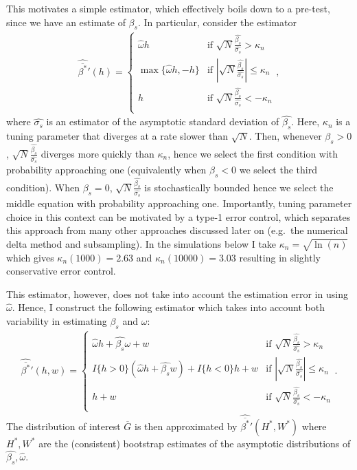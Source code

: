 \documentclass[12pt,a4paper,english]{article} %
\numberwithin{equation}{section}
\theoremstyle{definition}
\theoremstyle{remark}
\theoremstyle{plain}
\begin{document}
This motivates a simple estimator, which effectively boils down to a pre-test, since we have an estimate of $\beta_s$.
In particular, consider the estimator
\begin{align*}
  \hat{\overline{\beta^*}}'(h) =
  \begin{cases}
    \hat{\omega} h  &\text{if } \sqrt{N}\frac{\hat{\beta_s}}{\hat{\sigma_s}} > \kappa_n \\
    \max\{\hat{\omega} h, -h\} & \text{if } |\sqrt{N}\frac{\hat{\beta_s}}{\hat{\sigma_s}}| \leq \kappa_n \\
    h         & \text{if } \sqrt{N}\frac{\hat{\beta_s}}{\hat{\sigma_s}} < -\kappa_n\\
  \end{cases},
\end{align*}
where $\hat{\sigma_s}$ is an estimator of the asymptotic standard deviation of $\hat{\beta_s}$.
Here, $\kappa_n$ is a tuning parameter that diverges at a rate slower than $\sqrt{N}$.
Then, whenever $\beta_s > 0$, $\sqrt{N}\frac{\hat{\beta_s}}{\hat{\sigma_s}}$ diverges more quickly than $\kappa_n$, hence we select the first condition with probability approaching one (equivalently when $\beta_s < 0$ we select the third condition).
When $\beta_s = 0$, $\sqrt{N}\frac{\hat{\beta_s}}{\hat{\sigma_s}}$ is stochastically bounded hence we select the middle equation with probability approaching one.
Importantly, tuning parameter choice in this context can be motivated by a type-1 error control, which separates this approach from many other approaches discussed later on (e.g.\ the numerical delta method and subsampling).
In the simulations below I take $\kappa_n = \sqrt{\ln(n)}$ which gives $\kappa_n(1000) = 2.63$ and $\kappa_n(10000) = 3.03$ resulting in slightly conservative error control.

This estimator, however, does not take into account the estimation error in using $\hat{\omega}$.
Hence, I construct the following estimator which takes into account both variability in estimating $\beta_s$ and $\omega$:
\begin{align*}
  \hat{\overline{\beta^*}}'(h, w) =
  \begin{cases}
    \hat{\omega} h + \hat{\beta_s} \omega + w &\text{if } \sqrt{N}\frac{\hat{\beta_s}}{\hat{\sigma_s}} > \kappa_n \\
    I\{h > 0\}(\hat{\omega} h + \hat{\beta_s} w) + I\{h<0\} h + w & \text{if } |\sqrt{N}\frac{\hat{\beta_s}}{\hat{\sigma_s}}| \leq \kappa_n \\
    h + w         & \text{if } \sqrt{N}\frac{\hat{\beta_s}}{\hat{\sigma_s}} < - \kappa_n\\
  \end{cases}.
\end{align*}
The distribution of interest $\overline{G}$ is then approximated by $\hat{\overline{\beta^*}}'(H^*, W^*)$ where $H^*,W^*$ are the (consistent) bootstrap estimates of the asymptotic distributions of $\hat{\beta_s}, \hat{\omega}$.
\end{document}
